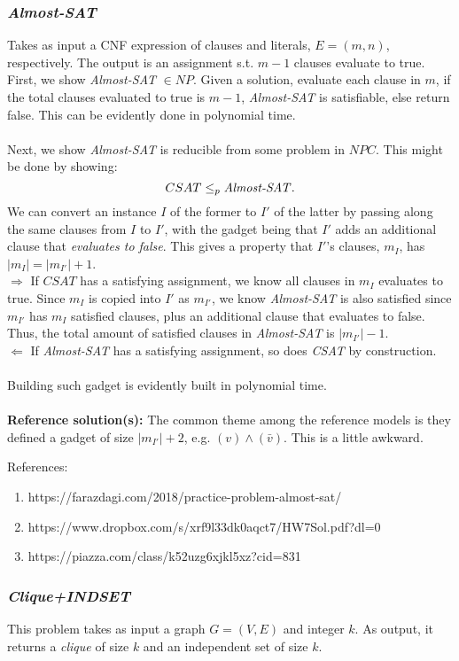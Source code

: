 \documentclass{article}
\theoremstyle{definition}
\begin{document}
\subsubsection{\textit{Almost-SAT}}
Takes as input a CNF expression of clauses and literals, $E = (m,n)$, respectively. The output is an assignment s.t. $m-1$ clauses evaluate to true.\\
First, we show \textit{Almost-SAT} $\in NP$. Given a solution, evaluate each clause in $m$, if the total clauses evaluated to true is $m-1$, \textit{Almost-SAT} is satisfiable, else return false. This can be evidently done in polynomial time.\\\\
Next, we show \textit{Almost-SAT} is reducible from some problem in $NPC$. This might be done by showing:
$$CSAT \leq_p \text{\textit{Almost-SAT}}.$$
We can convert an instance $I$ of the former to $I'$ of the latter by passing along the same clauses from $I$ to $I'$, with the gadget being that $I'$ adds an additional clause that \textit{evaluates to false}. This gives a property that $I'$'s clauses, $m_I$, has $|m_I| = |m_{I'}|+1$.\\
$\Rightarrow$ If $CSAT$ has a satisfying assignment, we know all clauses in $m_I$ evaluates to true. Since $m_I$ is copied into $I'$ as $m_{I'}$, we know \textit{Almost-SAT} is also satisfied since $m_{I'}$ has $m_{I}$ satisfied clauses, plus an additional clause that evaluates to false. Thus, the total amount of satisfied clauses in \textit{Almost-SAT} is $|m_{I'}|-1$.\\
$\Leftarrow$ If \textit{Almost-SAT} has a satisfying assignment, so does \textit{CSAT} by construction.\\\\
Building such gadget is evidently built in polynomial time.\\\\
\textbf{Reference solution(s):} The common theme among the reference models is they defined a gadget of size $|m_{I'}|+2$, e.g. $(v) \land (\bar{v})$. This is a little awkward.

References:
\begin{enumerate}
	\item https://farazdagi.com/2018/practice-problem-almost-sat/
	\item https://www.dropbox.com/s/xrf9l33dk0aqct7/HW7Sol.pdf?dl=0
	\item https://piazza.com/class/k52uzg6xjkl5xz?cid=831
\end{enumerate}

\subsubsection{\textit{Clique+INDSET}}
This problem takes as input a graph $G = (V,E)$ and integer $k$. As output, it returns a \textit{clique} of size $k$ and an independent set of size $k$. 
\end{document}
